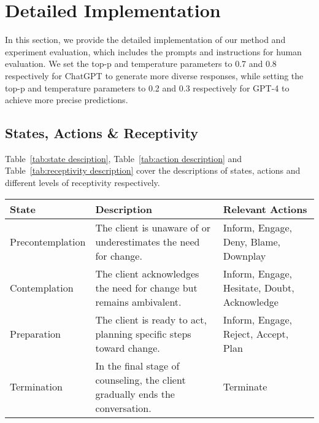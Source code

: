 \section{Detailed Implementation}
\label{app:implement}

In this section, we provide the detailed implementation of our method and experiment evaluation, which includes the prompts and instructions for human evaluation. We set the top-p and temperature parameters to 0.7 and 0.8 respectively for ChatGPT to generate more diverse responses, while setting the top-p and temperature parameters to 0.2 and 0.3 respectively for GPT-4 to achieve more precise predictions.

\subsection{States, Actions \& Receptivity}

Table~\ref{tab:state desciption}, Table~\ref{tab:action description} and Table~\ref{tab:receptivity description} cover the descriptions of states, actions and different levels of receptivity respectively. %


\begin{table*}[tb]
\centering
\begin{tabularx}{\textwidth}{lXp{4cm}}
\toprule
State            & Description                                                                                                                                  & Relevant Actions                                    \\ \midrule
Precontemplation & The client is unaware of or underestimates the need for change.           & Inform, Engage, Deny, \newline Blame, Downplay     \\ \hline
Contemplation    & The client acknowledges the need for change but remains ambivalent.     & Inform, Engage, Hesitate, \newline  Doubt, Acknowledge    \\ \hline
Preparation      & The client is ready to act, planning specific steps toward change.                                        & Inform, Engage, Reject, \newline Accept, Plan\\ \hline
Termination      & In the final stage of counseling, the client gradually ends the conversation.                                                     & Terminate     \\ \bottomrule
\end{tabularx}
\caption{The states of change and corresponding actions used in our simulation framework.}
\label{tab:state desciption}
\end{table*}



